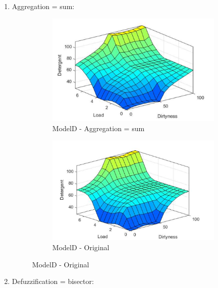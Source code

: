 \documentclass[11pt]{article}
\begin{document}
\begin{enumerate}[label=(\alph*)]
  \begin{enumerate}[label=(\roman*)]

    \item Aggregation = sum:

    \begin{figure}[ht!]
    \centering
    \begin{subfigure}{.5\textwidth}
      \centering
      \includegraphics[width=.9\linewidth]{res/modelD_aggregation}
      \caption{ModelD - Aggregation = sum}
      \label{fig:sub1}
    \end{subfigure}%
    \begin{subfigure}{.5\textwidth}
      \centering
      \includegraphics[width=.9\linewidth]{res/image2}
      \caption{ModelD - Original}
      \label{fig:sub2}
    \end{subfigure}
    \end{figure}

    \item Defuzziﬁcation = bisector:


\end{enumerate}
\end{enumerate}
\end{document}

